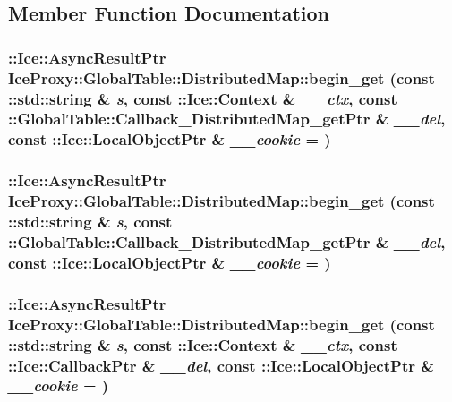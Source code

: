 \subsection{Member Function Documentation}
\hypertarget{class_ice_proxy_1_1_global_table_1_1_distributed_map_a99f52b06da4fe74328436932b04cc4a5}{
\subsubsection[{begin\_\-get}]{\setlength{\rightskip}{0pt plus 5cm}::Ice::AsyncResultPtr IceProxy::GlobalTable::DistributedMap::begin\_\-get (const ::std::string \& {\em s}, \/  const ::Ice::Context \& {\em \_\-\_\-ctx}, \/  const ::{\bf GlobalTable::Callback\_\-DistributedMap\_\-getPtr} \& {\em \_\-\_\-del}, \/  const ::Ice::LocalObjectPtr \& {\em \_\-\_\-cookie} = {})}}
\label{class_ice_proxy_1_1_global_table_1_1_distributed_map_a99f52b06da4fe74328436932b04cc4a5}
\hypertarget{class_ice_proxy_1_1_global_table_1_1_distributed_map_ae3678bd85d9c6ca40020ff158f7dbb4b}{
\subsubsection[{begin\_\-get}]{\setlength{\rightskip}{0pt plus 5cm}::Ice::AsyncResultPtr IceProxy::GlobalTable::DistributedMap::begin\_\-get (const ::std::string \& {\em s}, \/  const ::{\bf GlobalTable::Callback\_\-DistributedMap\_\-getPtr} \& {\em \_\-\_\-del}, \/  const ::Ice::LocalObjectPtr \& {\em \_\-\_\-cookie} = {})}}
\label{class_ice_proxy_1_1_global_table_1_1_distributed_map_ae3678bd85d9c6ca40020ff158f7dbb4b}
\hypertarget{class_ice_proxy_1_1_global_table_1_1_distributed_map_a3f6b6e7aea12069b148799d36ef93e3a}{
\subsubsection[{begin\_\-get}]{\setlength{\rightskip}{0pt plus 5cm}::Ice::AsyncResultPtr IceProxy::GlobalTable::DistributedMap::begin\_\-get (const ::std::string \& {\em s}, \/  const ::Ice::Context \& {\em \_\-\_\-ctx}, \/  const ::Ice::CallbackPtr \& {\em \_\-\_\-del}, \/  const ::Ice::LocalObjectPtr \& {\em \_\-\_\-cookie} = {})}}
